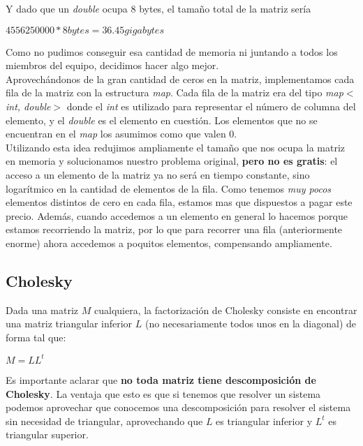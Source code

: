 Y dado que un \textit{double} ocupa 8 bytes, el tamaño total de la matriz sería
\begin{center}
    $4 556 250 000 * 8 bytes = 36.45 gigabytes$
\end{center}

Como no pudimos conseguir esa cantidad de memoria ni juntando a todos los miembros del equipo, decidimos hacer algo mejor. \\

Aprovechándonos de la gran cantidad de ceros en la matriz, implementamos cada fila de la matriz con la estructura \textit{map}. Cada fila de la matriz era del tipo \textit{map$<$int, double$>$} donde el \textit{int} es utilizado para representar el número de columna del elemento, y el \textit{double} es el elemento en cuestión. Los elementos que no se encuentran en el \textit{map} los asumimos como que valen 0. \\

Utilizando esta idea redujimos ampliamente el tamaño que nos ocupa la matriz en memoria y solucionamos nuestro problema original, \textbf{pero no es gratis}: el acceso a un elemento de la matriz ya no será en tiempo constante, sino logarítmico en la cantidad de elementos de la fila. Como tenemos \textit{muy pocos} elementos distintos de cero en cada fila, estamos mas que dispuestos a pagar este precio. Además, cuando accedemos a un elemento en general lo hacemos porque estamos recorriendo la matriz, por lo que para recorrer una fila (anteriormente enorme) ahora accedemos a poquitos elementos, compensando ampliamente. \\

\subsection{Cholesky}

Dada una matriz $M$ cualquiera, la factorización de Cholesky consiste en encontrar una matriz triangular inferior $L$ (no necesariamente todos unos en la diagonal) de forma tal que:
\begin{center}
$M = L L^t$
\end{center}

Es importante aclarar que \textbf{no toda matriz tiene descomposición de Cholesky}.
La ventaja que esto es que si tenemos que resolver un sistema podemos aprovechar que conocemos una descomposición para resolver el sistema sin necesidad de triangular, aprovechando que $L$ es triangular inferior y $L^t$ es triangular superior.

